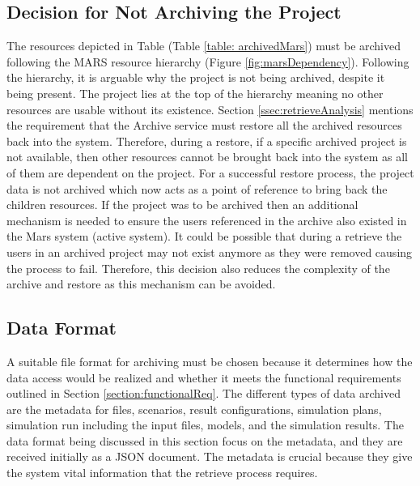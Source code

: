 \subsection{Decision for Not Archiving the Project}
The resources depicted in Table (Table \ref{table: archivedMars}) must be archived following the MARS resource hierarchy (Figure \ref{fig:marsDependency}).
Following the hierarchy, it is arguable why the project is not being archived, despite it being present. The project lies at the top of the hierarchy 
meaning no other resources are usable without its existence. Section \ref{ssec:retrieveAnalysis} mentions the requirement that the Archive service must 
restore all the archived resources back into the system. Therefore, during a restore, if a specific archived project
is not available, then other resources cannot be brought back into the system as all of them are dependent on the project. For a successful restore process,
the project data is not archived which now acts as a point of reference to bring back the children resources. 
If the project was to be archived then an additional mechanism is needed to ensure the users referenced in the archive also existed in the Mars system (active system).
It could be possible that during a retrieve the users in an
archived project may not exist anymore as they were removed causing the process to fail. Therefore, this decision also reduces the complexity of the 
archive and restore as this mechanism can be avoided.


\subsection{Data Format}
A suitable file format for archiving must be chosen because it determines how the data access would be realized and whether it meets
the functional requirements outlined in Section \ref{section:functionalReq}. The different types of data archived are the metadata for files, scenarios, 
result configurations, simulation plans, simulation run including the input files, models, and the simulation results. 
The data format being discussed in this section focus on the metadata, and they are received initially as a JSON document.
The metadata is crucial because they give the system vital information that the retrieve process requires. 

